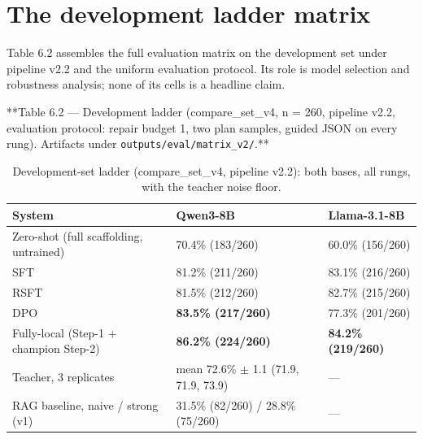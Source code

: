 \documentclass[10pt]{article} %
\begin{document}
\section{The development ladder matrix}\label{sec:the-development-ladder-matrix}

Table 6.2 assembles the full evaluation matrix on the development set under pipeline v2.2 and
the uniform evaluation protocol. Its role is model selection and robustness analysis; none of
its cells is a headline claim.

**Table 6.2 --- Development ladder (compare\_set\_v4, n = 260, pipeline v2.2, evaluation protocol:
repair budget 1, two plan samples, guided JSON on every rung). Artifacts under
\texttt{outputs/eval/matrix\_v2/}.**

\begin{table}[t]
\centering
\small
\caption{Development-set ladder (compare\_set\_v4, pipeline v2.2): both bases, all rungs, with the teacher noise floor.}
\label{tab:06_experiments_2}
\begin{tabular}{lll}
\toprule
System & Qwen3-8B & Llama-3.1-8B \\
\midrule
Zero-shot (full scaffolding, untrained) & 70.4\% (183/260) & 60.0\% (156/260) \\
SFT & 81.2\% (211/260) & 83.1\% (216/260) \\
RSFT & 81.5\% (212/260) & 82.7\% (215/260) \\
DPO & \textbf{83.5\% (217/260)} & 77.3\% (201/260) \\
Fully-local (Step-1 + champion Step-2) & \textbf{86.2\% (224/260)} & \textbf{84.2\% (219/260)} \\
Teacher, 3 replicates & mean 72.6\% $\pm$ 1.1 (71.9, 71.9, 73.9) & --- \\
RAG baseline, naive / strong (v1) & 31.5\% (82/260) / 28.8\% (75/260) & --- \\
\bottomrule
\end{tabular}
\end{table}
\end{document}

